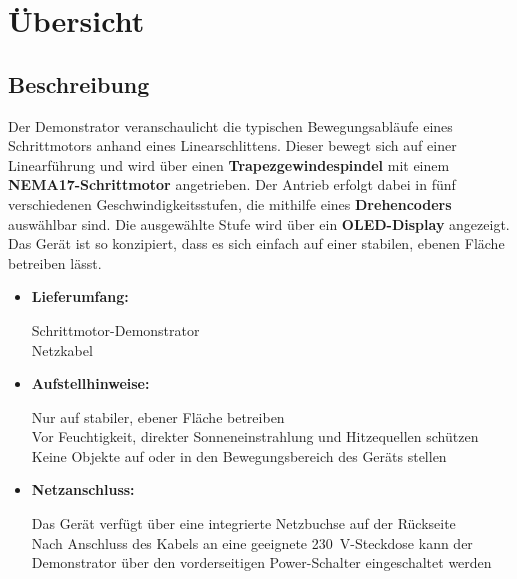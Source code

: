 \documentclass[a4paper,12pt,final]{report}
\begin{document}
	\chapter{Übersicht}
	\section{Beschreibung}
	
	Der Demonstrator veranschaulicht die typischen Bewegungsabläufe eines Schrittmotors anhand eines Linearschlittens. Dieser bewegt sich auf einer Linearführung und wird über einen \textbf{Trapezgewindespindel} mit einem \textbf{NEMA17-Schrittmotor} angetrieben. Der Antrieb erfolgt dabei in fünf verschiedenen Geschwindigkeitsstufen, die mithilfe eines \textbf{Drehencoders} auswählbar sind. Die ausgewählte Stufe wird über ein \textbf{OLED-Display} angezeigt. Das Gerät ist so konzipiert, dass es sich einfach auf einer stabilen, ebenen Fläche betreiben lässt.\\ 
	
	\begin{itemize}[leftmargin=1.5em]
		 
		
		\item\textbf{Lieferumfang:} 
		
		Schrittmotor-Demonstrator\\
		
		Netzkabel\\
		
		\item\textbf{Aufstellhinweise:} 
		
		Nur auf stabiler, ebener Fläche betreiben\\
		Vor Feuchtigkeit, direkter Sonneneinstrahlung und Hitzequellen schützen\\
		
		Keine Objekte auf oder in den Bewegungsbereich des Geräts stellen\\
		
		\item\textbf{Netzanschluss:}  
		
		Das Gerät verfügt über eine integrierte Netzbuchse auf der Rückseite\\
		
		Nach Anschluss des Kabels an eine geeignete 230\ V-Steckdose kann der Demonstrator über den vorderseitigen Power-Schalter eingeschaltet werden\\
		
	\end{itemize}
	\newpage
	
\end{document}
